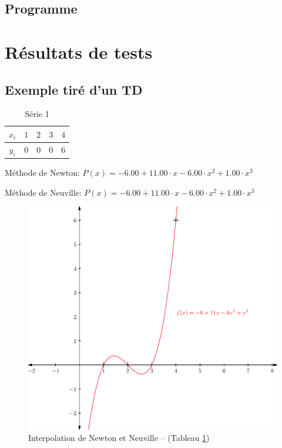 \documentclass{report}
\begin{document}
      \subsection{Programme}
	
    \newpage
    \section{Résultats de tests}
      \subsection{Exemple tiré d'un TD}
	\begin{table}[h]
	  \centering
	  \begin{tabular}{| c | c | c | c | c |}
	  \hline 
	  $x_{i}$ & $1$ & $2$ & $3$ & $4$ \\ 
	  \hline 
	  $y_{i}$ & $0$ & $0$ & $0$ & $6$ \\ 
	  \hline 
	  \end{tabular}
	  \caption{Série 1}
	  \label{inter_td3_ex3}
	\end{table}

	Méthode de Newton: $P(x)= -6.00 + 11.00 \cdot x- 6.00 \cdot x^{2}  + 1.00 \cdot x^{3} $

	Méthode de Neuville: $P(x)= -6.00 + 11.00 \cdot x- 6.00 \cdot x^{2}  + 1.00 \cdot x^{3} $
	
	\begin{figure}[h]
	  \centering
	  \includegraphics[scale=0.7]{graphiques/pdf_output/inter_test1.pdf}
	  \caption{Interpolation de Newton et Neuville -- (Tableau \ref{inter_td3_ex3})}
	\end{figure}
      \newpage
      
\end{document}
